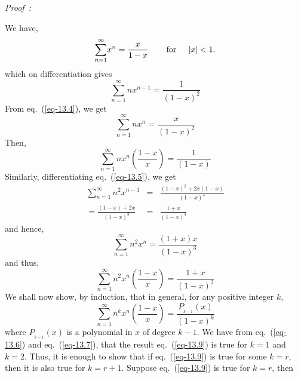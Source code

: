\begin{multicols}{2}
{\it Proof~:}

We have,
\begin{equation}\nonumber
\displaystyle{\sum_{n=1}^{\infty}}x^n = \displaystyle{\frac{x}{1-x}} \hspace{0.3in} \textup{for} \hspace{0.2in} |x| < 1.
\end{equation}
which on differentiation gives
\begin{equation}
\displaystyle{\sum_{n=1}^{\infty}}nx^{n-1} = \displaystyle{\frac{1}{(1-x)^2}}\label{eq-13.4}
\end{equation}
From eq.~(\ref{eq-13.4}), we get
\begin{equation}
\displaystyle{\sum_{n=1}^{\infty}}nx^{n} = \displaystyle{\frac{x}{(1-x)^2}}\label{eq-13.5}
\end{equation}
Then, 
\begin{equation}
\displaystyle{\sum_{n=1}^{\infty}}nx^{n}\left(\displaystyle{\frac{1-x}{x}}\right) = \displaystyle{\frac{1}{(1-x)}}\label{eq-13.6}
\end{equation}
Similarly, differentiating eq.~(\ref{eq-13.5}), we get
\begin{eqnarray}
\displaystyle{\sum_{n=1}^{\infty}}n^2x^{n-1} &=& \displaystyle{\frac{(1-x)^2 + 2x(1-x)}{(1-x)^4}}\nonumber\\
= \displaystyle{\frac{(1-x)+2x}{(1-x)^3}}&=& \displaystyle{\frac{1+x}{(1-x)^3}}\label{eq-13.7}
\end{eqnarray}
and hence,
\begin{equation}\nonumber
\displaystyle{\sum_{n=1}^{\infty}}n^2x^{n} = \displaystyle{\frac{(1+x)x}{(1-x)^3}}
\end{equation}
and thus,
\begin{equation}
\displaystyle{\sum_{n=1}^{\infty}}n^2x^n\left(\frac{1-x}{x}\right) = \displaystyle{\frac{1+x}{(1-x)^2}}\label{eq-13.8}
\end{equation}
We shall now show, by induction, that in general, for any positive integer $k$,
\begin{equation}
\displaystyle{\sum_{n=1}^{\infty}}n^k x^n \left(\frac{1-x}{x}\right) = \displaystyle{\frac{P_{_{k-1}}(x)}{(1-x)^k}}\label{eq-13.9}
\end{equation}
where $P_{_{k-1}}(x)$ is a polynomial in $x$ of degree $k-1$.
We have from eq.~(\ref{eq-13.6}) and eq.~(\ref{eq-13.7}), that the result eq.~(\ref{eq-13.9}) is true for $k = 1$ and $k = 2$. Thus, it is enough to show that if eq.~(\ref{eq-13.9}) is true for some $k = r$, then it is also true for $k = r+1$. Suppose eq.~(\ref{eq-13.9}) is true for $k = r$, then

\end{multicols}

